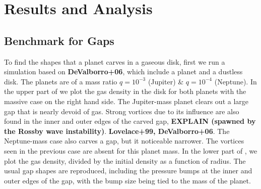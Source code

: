 \documentclass[onecolumn]{report}
\begin{document}


\chapter{Results and Analysis} \label{chap:results}

\section{Benchmark for Gaps}

To find the shapes that a planet carves in a gaseous disk, first we run a simulation based on \textbf{DeValborro+06}, which include a planet and a dustless disk. The planets are of a mass ratio $q=10^{-3}$ (Jupiter) \& $q=10^{-4}$ (Neptune). In the upper part of  we plot the gas density in the disk for both planets with the massive case on the right hand side. The Jupiter-mass planet clears out a large gap that is nearly devoid of gas. Strong vortices due to its influence are also found in the inner and outer edges of the carved gap, \textbf{EXPLAIN (spawned by the Rossby wave instability)}. \textbf{Lovelace+99, DeValborro+06}. The Neptune-mass case also carves a gap, but it noticeable narrower. The vortices seen in the previous case are absent for this planet mass. In the lower part of , we plot the gas density, divided by the initial density as a function of radius. The usual gap shapes are reproduced, including the pressure bumps at the inner and outer edges of the gap, with the bump size being tied to the mass of the planet.
\end{document}
